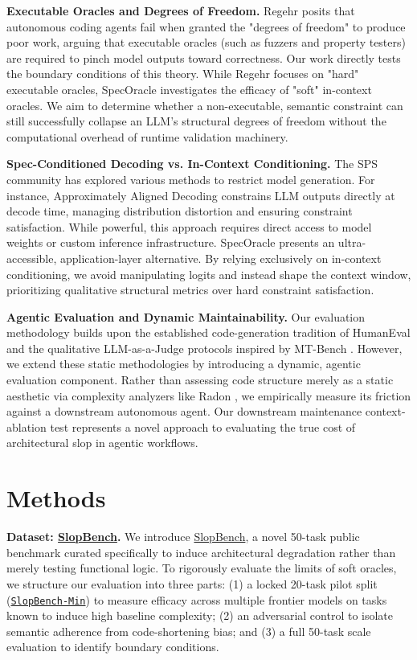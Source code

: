 \documentclass[11pt]{article}
\begin{document}
\textbf{Executable Oracles and Degrees of Freedom.} 
Regehr \cite{Regehr2026ZeroDOF} posits that autonomous coding agents fail when granted the "degrees of freedom" to produce poor work, arguing that executable oracles (such as fuzzers and property testers) are required to pinch model outputs toward correctness. Our work directly tests the boundary conditions of this theory. While Regehr focuses on "hard" executable oracles, SpecOracle investigates the efficacy of "soft" in-context oracles. We aim to determine whether a non-executable, semantic constraint can still successfully collapse an LLM's structural degrees of freedom without the computational overhead of runtime validation machinery.

\textbf{Spec-Conditioned Decoding vs. In-Context Conditioning.} 
The SPS community has explored various methods to restrict model generation. For instance, Approximately Aligned Decoding \cite{Melcer2024AprAD} constrains LLM outputs directly at decode time, managing distribution distortion and ensuring constraint satisfaction. While powerful, this approach requires direct access to model weights or custom inference infrastructure. SpecOracle presents an ultra-accessible, application-layer alternative. By relying exclusively on in-context conditioning, we avoid manipulating logits and instead shape the context window, prioritizing qualitative structural metrics over hard constraint satisfaction.

\textbf{Agentic Evaluation and Dynamic Maintainability.} 
Our evaluation methodology builds upon the established code-generation tradition of HumanEval \cite{Chen2021HumanEval} and the qualitative LLM-as-a-Judge protocols inspired by MT-Bench \cite{Zheng2023Judge}. However, we extend these static methodologies by introducing a dynamic, agentic evaluation component. Rather than assessing code structure merely as a static aesthetic via complexity analyzers like Radon \cite{Radon}, we empirically measure its friction against a downstream autonomous agent. Our downstream maintenance context-ablation test represents a novel approach to evaluating the true cost of architectural slop in agentic workflows.

\section{Methods}

\textbf{Dataset: \href{https://github.com/davidkimai/specoracle/tree/main/data/slopbench}{SlopBench}.} 
We introduce \href{https://github.com/davidkimai/specoracle/tree/main/data/slopbench}{SlopBench}, a novel 50-task public benchmark curated specifically to induce architectural degradation rather than merely testing functional logic. To rigorously evaluate the limits of soft oracles, we structure our evaluation into three parts: (1) a locked 20-task pilot split (\href{https://github.com/davidkimai/specoracle/tree/main/data/slopbench_min}{\texttt{SlopBench-Min}}) to measure efficacy across multiple frontier models on tasks known to induce high baseline complexity; (2) an adversarial control to isolate semantic adherence from code-shortening bias; and (3) a full 50-task scale evaluation to identify boundary conditions.
\end{document}
